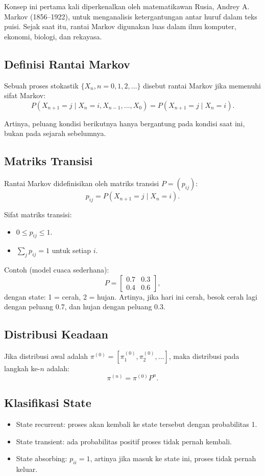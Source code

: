 \documentclass{bukumjh}
\begin{document}
Konsep ini pertama kali diperkenalkan oleh matematikawan Rusia, Andrey A. Markov (1856–1922), untuk menganalisis ketergantungan antar huruf dalam teks puisi. Sejak saat itu, rantai Markov digunakan luas dalam ilmu komputer, ekonomi, biologi, dan rekayasa.

\subsection{Definisi Rantai Markov}
Sebuah proses stokastik $\{X_n, n=0,1,2,\dots\}$ disebut {\jsg rantai Markov} jika memenuhi sifat {\jsg Markov}:
\[
P(X_{n+1} = j \mid X_n = i, X_{n-1},\dots,X_0) = P(X_{n+1} = j \mid X_n = i).
\]

Artinya, peluang kondisi berikutnya hanya bergantung pada kondisi saat ini, bukan pada sejarah sebelumnya. 

\subsection{Matriks Transisi}
Rantai Markov didefinisikan oleh {\jsg matriks transisi} $P = (p_{ij})$:
\[
p_{ij} = P(X_{n+1}=j \mid X_n = i).
\]

Sifat matriks transisi:
\begin{itemize}
    \item $0 \leq p_{ij} \leq 1$.
    \item $\sum_j p_{ij} = 1$ untuk setiap $i$.
\end{itemize}

Contoh (model cuaca sederhana):
\[
P = \begin{bmatrix}
0.7 & 0.3 \\
0.4 & 0.6
\end{bmatrix},
\]
dengan state: 1 = cerah, 2 = hujan. Artinya, jika hari ini cerah, besok cerah lagi dengan peluang 0.7, dan hujan dengan peluang 0.3.

\subsection{Distribusi Keadaan}
Jika distribusi awal adalah $\pi^{(0)} = [\pi_1^{(0)}, \pi_2^{(0)}, \dots]$, maka distribusi pada langkah ke-$n$ adalah:
\[
\pi^{(n)} = \pi^{(0)} P^n.
\]

\subsection{Klasifikasi State}
\begin{itemize}
    \item {\jsg State recurrent}: proses akan kembali ke state tersebut dengan probabilitas 1.
    \item {\jsg State transient}: ada probabilitas positif proses tidak pernah kembali.
    \item {\jsg State absorbing}: $p_{ii}=1$, artinya jika masuk ke state ini, proses tidak pernah keluar.
\end{itemize}
\end{document}
